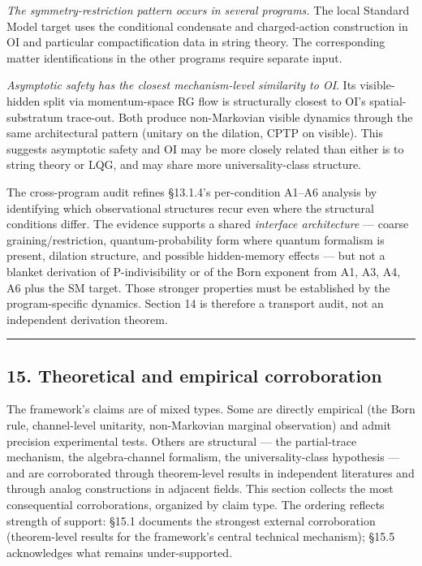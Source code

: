 \documentclass[
]{article}
\begin{document}
\emph{The symmetry-restriction pattern occurs in several programs.} The
local Standard Model target uses the conditional condensate and
charged-action construction in OI and particular compactification data
in string theory. The corresponding matter identifications in the other
programs require separate input.

\emph{Asymptotic safety has the closest mechanism-level similarity to
OI}. Its visible-hidden split via momentum-space RG flow is structurally
closest to OI's spatial-substratum trace-out. Both produce non-Markovian
visible dynamics through the same architectural pattern (unitary on the
dilation, CPTP on visible). This suggests asymptotic safety and OI may
be more closely related than either is to string theory or LQG, and may
share more universality-class structure.

The cross-program audit refines §13.1.4's per-condition A1--A6 analysis
by identifying which observational structures recur even where the
structural conditions differ. The evidence supports a shared
\emph{interface architecture} --- coarse graining/restriction,
quantum-probability form where quantum formalism is present, dilation
structure, and possible hidden-memory effects --- but not a blanket
derivation of P-indivisibility or of the Born exponent from A1, A3, A4,
A6 plus the SM target. Those stronger properties must be established by
the program-specific dynamics. Section 14 is therefore a transport
audit, not an independent derivation theorem.

\begin{center}\rule{0.5\linewidth}{0.5pt}\end{center}

\hypertarget{theoretical-and-empirical-corroboration}{%
\subsection{15. Theoretical and empirical
corroboration}\label{theoretical-and-empirical-corroboration}}

The framework's claims are of mixed types. Some are directly empirical
(the Born rule, channel-level unitarity, non-Markovian marginal
observation) and admit precision experimental tests. Others are
structural --- the partial-trace mechanism, the algebra-channel
formalism, the universality-class hypothesis --- and are corroborated
through theorem-level results in independent literatures and through
analog constructions in adjacent fields. This section collects the most
consequential corroborations, organized by claim type. The ordering
reflects strength of support: §15.1 documents the strongest external
corroboration (theorem-level results for the framework's central
technical mechanism); §15.5 acknowledges what remains under-supported.
\end{document}
